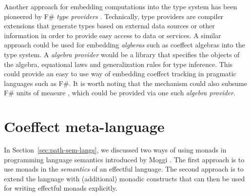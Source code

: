 Another approach for embedding computations into the type system has been pioneered by F\#
\emph{type providers} \cite{app-inforich}. Technically, type providers are compiler extensions 
that generate types based on external data sources or other information in order to provide easy 
access to data or services. A similar approach could be used for embedding \emph{algberas} such
as coeffect algebras into the type system. A \emph{algebra provider} would be a library that 
specifies the objects of the algebra, equational laws and generalization rules for type inference.
This could provide an easy to use way of embedding coeffect tracking in pragmatic languages
such as F\#. It is worth noting that the mechanism could also subsume F\# units of measure
\cite{types-units-of-measure}, which could be provided via one such \emph{algebra provider}.



%                                                                                             

\section{Coeffect meta-language}
\label{sec:conclusions-meta} 

In Section~\ref{sec:path-sem-langs}, we discussed two ways of using monads in programming
language semantics introduced by Moggi \cite{monad-notions}. The first approach is to use
monads in the \emph{semantics} of an effectful language. The second approach is to extend the
language with (additional) monadic constructs that can then be used for writing effectful
monads explicitly.

